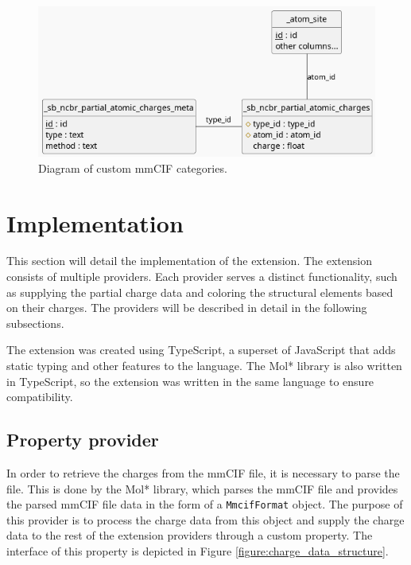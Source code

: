 \documentclass[
  digital,     %
  oneside,     %
  nosansbold,  %
  nocolorbold, %
  lof,         %
  lot,         %
]{fithesis4}
\begin{document}
\begin{figure}
  \begin{center}
    \includegraphics[width=\textwidth]{figures/mmcif_erd.png}
  \end{center}
  \caption{Diagram of custom mmCIF categories.}
  \label{fig:mmcif_erd}
\end{figure}

\section{Implementation}
\label{section:implementation}

This section will detail the implementation of the extension. The extension consists of multiple providers. Each provider serves a distinct functionality, such as supplying the partial charge data and coloring the structural elements based on their charges. The providers will be described in detail in the following subsections.

The extension was created using TypeScript, a superset of JavaScript that adds static typing and other features to the language. The Mol* library is also written in TypeScript, so the extension was written in the same language to ensure compatibility.

\subsection{Property provider}
\label{subsection:property_provider}

In order to retrieve the charges from the mmCIF file, it is necessary to parse the file. This is done by the Mol* library, which parses the mmCIF file and provides the parsed mmCIF file data in the form of a \texttt{MmcifFormat} object. The purpose of this provider is to process the charge data from this object and supply the charge data to the rest of the extension providers through a custom property. The interface of this property is depicted in Figure \ref{figure:charge_data_structure}.
\end{document}
